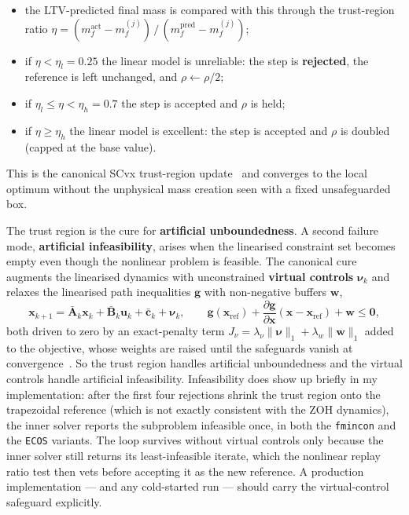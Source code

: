 \documentclass[../main.tex]{subfiles}
\begin{document}
\begin{itemize}
\begin{itemize}
        \item the LTV-predicted final mass is compared with this through the trust-region ratio $\eta = (m_f^{\mathrm{act}} - m_f^{(j)})\,/\,(m_f^{\mathrm{pred}} - m_f^{(j)})$;
        \item if $\eta < \eta_l = 0.25$ the linear model is unreliable: the step is \textbf{rejected}, the reference is left unchanged, and $\rho \leftarrow \rho/2$;
        \item if $\eta_l \leq \eta < \eta_h = 0.7$ the step is accepted and $\rho$ is held;
        \item if $\eta \geq \eta_h$ the linear model is excellent: the step is accepted and $\rho$ is doubled (capped at the base value).
    \end{itemize}
    This is the canonical SCvx trust-region update~\cite[Lecture~12]{dclvnotes} and converges to the local optimum without the unphysical mass creation seen with a fixed unsafeguarded box.
\end{itemize}

The trust region is the cure for \textbf{artificial unboundedness}. A second failure mode, \textbf{artificial infeasibility}, arises when the linearised constraint set becomes empty even though the nonlinear problem is feasible. The canonical cure augments the linearised dynamics with unconstrained \textbf{virtual controls} $\boldsymbol{\nu}_k$ and relaxes the linearised path inequalities $\mathbf{g}$ with non-negative buffers $\mathbf{w}$,
\begin{equation}
    \mathbf{x}_{k+1} = \bar{\mathbf{A}}_k\mathbf{x}_k + \bar{\mathbf{B}}_k\mathbf{u}_k + \bar{\mathbf{c}}_k + \boldsymbol{\nu}_k,
    \qquad
    \mathbf{g}(\mathbf{x}_{\mathrm{ref}}) + \frac{\partial\mathbf{g}}{\partial\mathbf{x}}(\mathbf{x}-\mathbf{x}_{\mathrm{ref}}) + \mathbf{w} \leq \mathbf{0},
    \label{eq:virtual_controls}
\end{equation}
both driven to zero by an exact-penalty term $J_\nu = \lambda_\nu\|\boldsymbol{\nu}\|_1 + \lambda_w\|\mathbf{w}\|_1$ added to the objective, whose weights are raised until the safeguards vanish at convergence~\cite[Sec.~3.4, Eqs.~(3.37)--(3.40)]{benedikter2022}. So the trust region handles artificial unboundedness and the virtual controls handle artificial infeasibility. Infeasibility does show up briefly in my implementation: after the first four rejections shrink the trust region onto the trapezoidal reference (which is not exactly consistent with the ZOH dynamics), the inner solver reports the subproblem infeasible once, in both the \texttt{fmincon} and the \texttt{ECOS} variants. The loop survives without virtual controls only because the inner solver still returns its least-infeasible iterate, which the nonlinear replay ratio test then vets before accepting it as the new reference. A production implementation --- and any cold-started run --- should carry the virtual-control safeguard explicitly.
\end{document}
